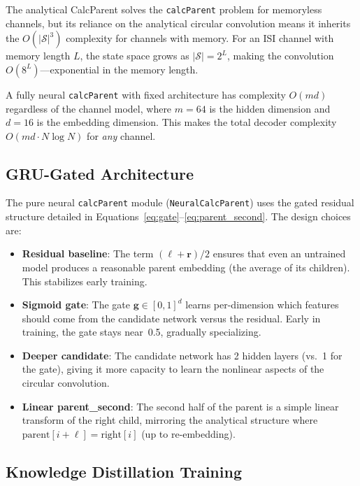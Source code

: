 \documentclass[11pt,a4paper]{article}
\begin{document}
The analytical CalcParent solves the \texttt{calcParent} problem for memoryless channels, but its reliance on the analytical circular convolution means it inherits the $O(|\mathcal{S}|^3)$ complexity for channels with memory. For an ISI channel with memory length $L$, the state space grows as $|\mathcal{S}| = 2^L$, making the convolution $O(8^L)$---exponential in the memory length.

A fully neural \texttt{calcParent} with fixed architecture has complexity $O(md)$ regardless of the channel model, where $m = 64$ is the hidden dimension and $d = 16$ is the embedding dimension. This makes the total decoder complexity $O(md \cdot N \log N)$ for \emph{any} channel.

\subsection{GRU-Gated Architecture}

The pure neural \texttt{calcParent} module (\texttt{NeuralCalcParent}) uses the gated residual structure detailed in Equations~\eqref{eq:gate}--\eqref{eq:parent_second}. The design choices are:

\begin{itemize}
    \item \textbf{Residual baseline}: The term $(\bm{\ell} + \bm{r}) / 2$ ensures that even an untrained model produces a reasonable parent embedding (the average of its children). This stabilizes early training.

    \item \textbf{Sigmoid gate}: The gate $\bm{g} \in [0, 1]^d$ learns per-dimension which features should come from the candidate network versus the residual. Early in training, the gate stays near~0.5, gradually specializing.

    \item \textbf{Deeper candidate}: The candidate network has 2 hidden layers (vs.\ 1 for the gate), giving it more capacity to learn the nonlinear aspects of the circular convolution.

    \item \textbf{Linear parent\_second}: The second half of the parent is a simple linear transform of the right child, mirroring the analytical structure where $\text{parent}[i + \ell] = \text{right}[i]$ (up to re-embedding).
\end{itemize}

\subsection{Knowledge Distillation Training}
\label{sec:distillation}
\end{document}
